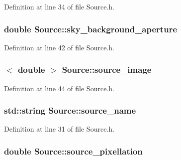 Definition at line 34 of file Source.h.

\hypertarget{classSource_aa21a6313f7ab7c41bb206ed05f0909cc}{
\subsubsection[{sky\_\-background\_\-aperture}]{\setlength{\rightskip}{0pt plus 5cm}double {\bf Source::sky\_\-background\_\-aperture}}}
\label{classSource_aa21a6313f7ab7c41bb206ed05f0909cc}


Definition at line 42 of file Source.h.

\hypertarget{classSource_ae39e6de7004f8f12968f38352c6c0f5e}{
\subsubsection[{source\_\-image}]{$<$ double $>$ {\bf Source::source\_\-image}}}
\label{classSource_ae39e6de7004f8f12968f38352c6c0f5e}


Definition at line 44 of file Source.h.

\hypertarget{classSource_aca080db4a19c5a8c149b6362aedcb0cd}{
\subsubsection[{source\_\-name}]{\setlength{\rightskip}{0pt plus 5cm}std::string {\bf Source::source\_\-name}}}
\label{classSource_aca080db4a19c5a8c149b6362aedcb0cd}


Definition at line 31 of file Source.h.

\hypertarget{classSource_ad8a9910f6a3d807ac0e1b42195ba4147}{
\subsubsection[{source\_\-pixellation}]{\setlength{\rightskip}{0pt plus 5cm}double {\bf Source::source\_\-pixellation}}}
\label{classSource_ad8a9910f6a3d807ac0e1b42195ba4147}


